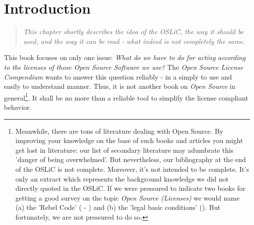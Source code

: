 %
%
%
%
%




\chapter{Introduction}

\footnotesize \begin{quote}\itshape This chapter shortly describes the idea of
the OSLiC, the way it should be used, and the way it can be read - what indeed
is not completely the same.
\end{quote}
\normalsize{}

This book focuses on only one issue: \emph{What do we have to do for acting
according to the licenses of those \emph{Open Source Software} we use?} The
\emph{Open Source License Compendium} wants to answer this question reliably -
in a simply to use and easily to understand manner. Thus, it is not another book
on \emph{Open Source} in ge\-ne\-ral\footnote{Meanwhile, there are tons of
literature dealing with Open Source. By improving your knowledge on the base of
such books and articles you might get lost in literature: our list of secondary
literature may adumbrate this 'danger of being overwhelmed'. But nevertheless,
our bibliography at the end of the OSLiC is not complete. Moreover, it's not
intended to be complete. It's only an extract which represents the background
knowledge we did not directly quoted in the OSLiC. If we were pressured to
indicate two books for getting a good survey on the topic \emph{Open Source
(Licenses)} we would name (a) the 'Rebel Code' (\cite[for a German version
cf.][\nopage passim]{Moody2001a} - \cite[for an English version
cf.][passim]{Moody2002a}) and (b) the 'legal basic conditions'
(\cite[cf.][\nopage passim]{JaeMet2011a}). But fortunately, we are not pressured
to do so.}. It shall be no more than a reliable tool to simplify the license
compliant behavior.

